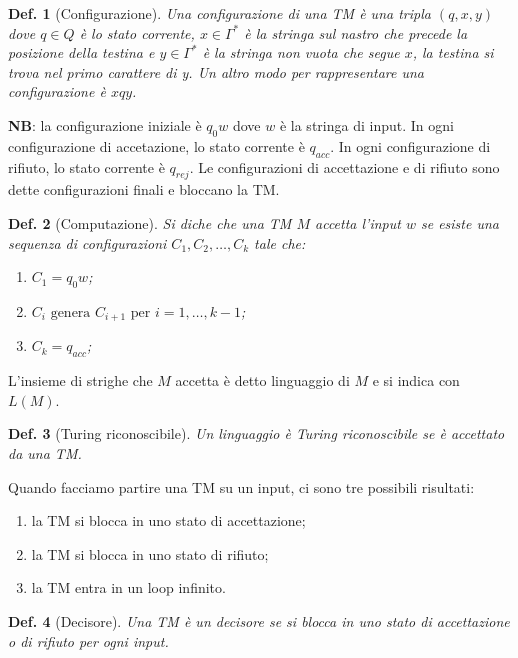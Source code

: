 \documentclass[11pt]{article}
\newtheorem{definition}{Def.}[section]
\begin{document}
\begin{definition}[Configurazione]
	Una configurazione di una TM è una tripla $(q, x, y)$ dove $q \in Q$ è lo
	stato corrente, $x \in \Gamma^*$ è la stringa sul nastro che precede la
	posizione della testina e $y \in \Gamma^*$ è la stringa non vuota che segue 
	$x$, la testina si trova nel primo carattere di y. Un altro modo per
	rappresentare una configurazione è $xqy$.
\end{definition}

\textbf{NB}: la configurazione iniziale è $q_0w$ dove $w$ è la stringa di input.
In ogni configurazione di accetazione, lo stato corrente è $q_{acc}$. In ogni
configurazione di rifiuto, lo stato corrente è $q_{rej}$. Le configurazioni
di accettazione e di rifiuto sono dette configurazioni finali e bloccano la
TM.

\begin{definition}[Computazione]
	Si diche che una TM $M$ accetta l'input $w$ se esiste una sequenza di
	configurazioni $C_1, C_2, \dots, C_k$ tale che:
	\begin{enumerate}
		\item $C_1 = q_0w$;
		\item $C_i \text{ genera } C_{i+1} \text{ per } i = 1, \dots, k-1$;
		\item $C_k = q_{acc}$;
	\end{enumerate}
\end{definition}

L'insieme di strighe che $M$ accetta è detto linguaggio di $M$ e si indica con
$L(M)$.

\begin{definition}[Turing riconoscibile]
	Un linguaggio è Turing riconoscibile se è accettato da una TM.
\end{definition}

Quando facciamo partire una TM su un input, ci sono tre possibili risultati:
\begin{enumerate}
	\item la TM si blocca in uno stato di accettazione;
	\item la TM si blocca in uno stato di rifiuto;
	\item la TM entra in un loop infinito.
\end{enumerate}

\begin{definition}[Decisore]
	Una TM è un decisore se si blocca in uno stato di accettazione o di rifiuto
	per ogni input.
\end{definition}
\end{document}

